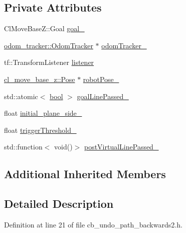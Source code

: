 \subsection*{Private Attributes}
\begin{DoxyCompactItemize}
\item 
Cl\+Move\+Base\+Z\+::\+Goal \hyperlink{classcl__move__base__z_1_1CbUndoPathBackwards2_ad119c38ee9cb341c9b468682d1794538}{goal\+\_\+}
\item 
\hyperlink{classcl__move__base__z_1_1odom__tracker_1_1OdomTracker}{odom\+\_\+tracker\+::\+Odom\+Tracker} $\ast$ \hyperlink{classcl__move__base__z_1_1CbUndoPathBackwards2_a1faa9bf6fef87280e28d4016f5c0843e}{odom\+Tracker\+\_\+}
\item 
tf\+::\+Transform\+Listener \hyperlink{classcl__move__base__z_1_1CbUndoPathBackwards2_a4531d3f52b12a4cce20ac1545ca2cb61}{listener}
\item 
\hyperlink{classcl__move__base__z_1_1Pose}{cl\+\_\+move\+\_\+base\+\_\+z\+::\+Pose} $\ast$ \hyperlink{classcl__move__base__z_1_1CbUndoPathBackwards2_a2d398dac07efaca840fbcea31957cf7a}{robot\+Pose\+\_\+}
\item 
std\+::atomic$<$ \hyperlink{classbool}{bool} $>$ \hyperlink{classcl__move__base__z_1_1CbUndoPathBackwards2_a1c037317330c74b60660548f09a01749}{goal\+Line\+Passed\+\_\+}
\item 
float \hyperlink{classcl__move__base__z_1_1CbUndoPathBackwards2_abc388e4c9576f04d1fad869aa8651750}{initial\+\_\+plane\+\_\+side\+\_\+}
\item 
float \hyperlink{classcl__move__base__z_1_1CbUndoPathBackwards2_a452bcdab678ea02d6d6a0ae06fb484ab}{trigger\+Threshold\+\_\+}
\item 
std\+::function$<$ void()$>$ \hyperlink{classcl__move__base__z_1_1CbUndoPathBackwards2_a2405e8194c63dce4462b6d4910031fe8}{post\+Virtual\+Line\+Passed\+\_\+}
\end{DoxyCompactItemize}
\subsection*{Additional Inherited Members}


\subsection{Detailed Description}


Definition at line 21 of file cb\+\_\+undo\+\_\+path\+\_\+backwards2.\+h.



